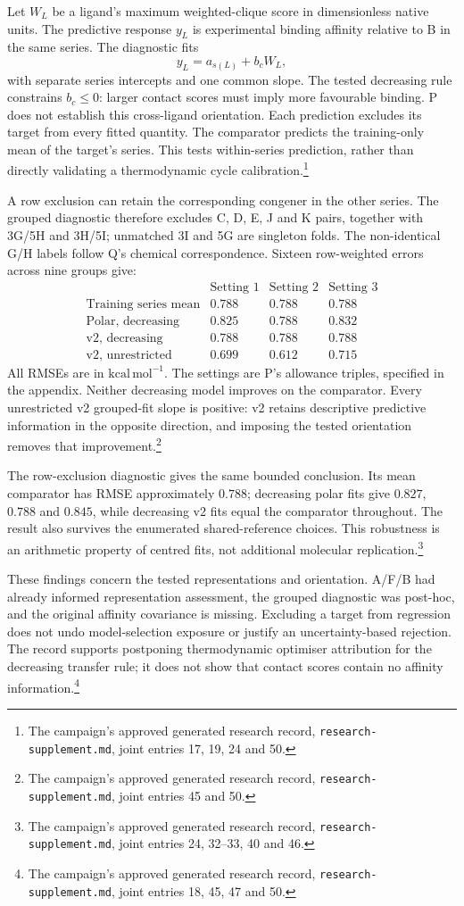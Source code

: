 \documentclass{article}
\newcommand{\rr}[1]{\footnote{The campaign's approved generated research record, \texttt{research-supplement.md}, #1.}}
\begin{document}
Let \(W_L\) be a ligand's maximum weighted-clique score in dimensionless native units. The predictive response \(y_L\) is experimental binding affinity relative to B in the same series. The diagnostic fits
\[
 y_L=a_{s(L)}+b_cW_L,
\]
with separate series intercepts and one common slope. The tested decreasing rule constrains \(b_c\leq0\): larger contact scores must imply more favourable binding. P does not establish this cross-ligand orientation. Each prediction excludes its target from every fitted quantity. The comparator predicts the training-only mean of the target's series. This tests within-series prediction, rather than directly validating a thermodynamic cycle calibration.\rr{joint entries 17, 19, 24 and 50}

A row exclusion can retain the corresponding congener in the other series. The grouped diagnostic therefore excludes C, D, E, J and K pairs, together with 3G/5H and 3H/5I; unmatched 3I and 5G are singleton folds. The non-identical G/H labels follow Q's chemical correspondence.\cite{Q} Sixteen row-weighted errors across nine groups give:
\[
\begin{array}{c|rrr}
 & \text{Setting 1} & \text{Setting 2} & \text{Setting 3}\\ \hline
\text{Training series mean} & 0.788 & 0.788 & 0.788\\
\text{Polar, decreasing} & 0.825 & 0.788 & 0.832\\
\text{v2, decreasing} & 0.788 & 0.788 & 0.788\\
\text{v2, unrestricted} & 0.699 & 0.612 & 0.715
\end{array}
\]
All RMSEs are in \(\mathrm{kcal\,mol^{-1}}\). The settings are P's allowance triples, specified in the appendix. Neither decreasing model improves on the comparator. Every unrestricted v2 grouped-fit slope is positive: v2 retains descriptive predictive information in the opposite direction, and imposing the tested orientation removes that improvement.\rr{joint entries 45 and 50}

The row-exclusion diagnostic gives the same bounded conclusion. Its mean comparator has RMSE approximately \(0.788\); decreasing polar fits give \(0.827\), \(0.788\) and \(0.845\), while decreasing v2 fits equal the comparator throughout. The result also survives the enumerated shared-reference choices. This robustness is an arithmetic property of centred fits, not additional molecular replication.\rr{joint entries 24, 32--33, 40 and 46}

These findings concern the tested representations and orientation. A/F/B had already informed representation assessment, the grouped diagnostic was post-hoc, and the original affinity covariance is missing. Excluding a target from regression does not undo model-selection exposure or justify an uncertainty-based rejection. The record supports postponing thermodynamic optimiser attribution for the decreasing transfer rule; it does not show that contact scores contain no affinity information.\rr{joint entries 18, 45, 47 and 50}
\end{document}
